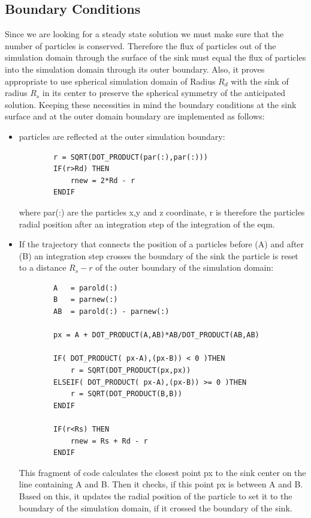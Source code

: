 \subsection{Boundary Conditions}
Since we are looking for a steady state solution we must make sure that the number of particles is conserved. Therefore the flux of particles out of the simulation domain through the surface of the sink must equal the flux of particles into the simulation domain through its outer boundary.
Also, it proves appropriate to use spherical simulation domain of Radius $R_d$ with the sink of radius $R_s$ in its center to preserve the spherical symmetry of the anticipated solution.
Keeping these necessities in mind the boundary conditions at the sink surface and at the outer domain boundary are implemented as follows: \\
\begin{itemize}
    \item particles are reflected at the outer simulation boundary:
        \begin{lstlisting}
        r = SQRT(DOT_PRODUCT(par(:),par(:)))
        IF(r>Rd) THEN
            rnew = 2*Rd - r
        ENDIF
        \end{lstlisting}
        where par(:) are the particles x,y and z coordinate, r is therefore the particles radial position after an integration step of the integration of the eqm.
    \item If the trajectory that connects the position of a particles before (A) and after (B) an integration step crosses the boundary of the sink the particle is reset to a distance $R_s - r$ of the outer boundary of the simulation domain:
        \begin{lstlisting}
        A   = parold(:)
        B   = parnew(:)
        AB  = parold(:) - parnew(:)

        px = A + DOT_PRODUCT(A,AB)*AB/DOT_PRODUCT(AB,AB)

        IF( DOT_PRODUCT( px-A),(px-B)) < 0 )THEN
            r = SQRT(DOT_PRODUCT(px,px))
        ELSEIF( DOT_PRODUCT( px-A),(px-B)) >= 0 )THEN
            r = SQRT(DOT_PRODUCT(B,B))
        ENDIF
        
        IF(r<Rs) THEN
            rnew = Rs + Rd - r
        ENDIF
        \end{lstlisting}
        This fragment of code calculates the closest point px to the sink center on the line containing A and B. Then it checks, if this point px is between A and B. Based on this, it updates the radial position of the particle to set it to the boundary of the simulation domain, if it crossed the boundary of the sink.
\end{itemize}
